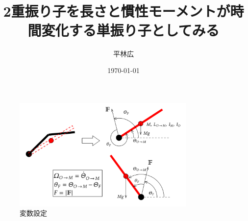 \documentclass[a4paper,11pt]{jsarticle}
\begin{document}
\title{2重振り子を長さと慣性モーメントが時間変化する単振り子としてみる}
\author{平林広}
\date{\today}
\maketitle


\begin{figure}[h]
  \centering
  \includegraphics[width = 0.8\textwidth]{config.png}
  \caption{変数設定}
  \label{config.png}
\end{figure}
\end{document}
